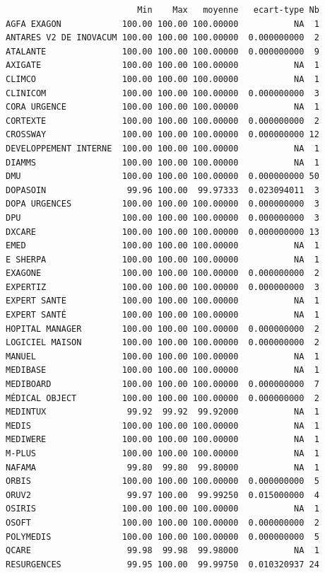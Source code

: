 \documentclass[]{article}
\begin{document}
\begin{verbatim}
                          Min    Max   moyenne   ecart-type Nb
AGFA EXAGON            100.00 100.00 100.00000           NA  1
ANTARES V2 DE INOVACUM 100.00 100.00 100.00000  0.000000000  2
ATALANTE               100.00 100.00 100.00000  0.000000000  9
AXIGATE                100.00 100.00 100.00000           NA  1
CLIMCO                 100.00 100.00 100.00000           NA  1
CLINICOM               100.00 100.00 100.00000  0.000000000  3
CORA URGENCE           100.00 100.00 100.00000           NA  1
CORTEXTE               100.00 100.00 100.00000  0.000000000  2
CROSSWAY               100.00 100.00 100.00000  0.000000000 12
DEVELOPPEMENT INTERNE  100.00 100.00 100.00000           NA  1
DIAMMS                 100.00 100.00 100.00000           NA  1
DMU                    100.00 100.00 100.00000  0.000000000 50
DOPASOIN                99.96 100.00  99.97333  0.023094011  3
DOPA URGENCES          100.00 100.00 100.00000  0.000000000  3
DPU                    100.00 100.00 100.00000  0.000000000  3
DXCARE                 100.00 100.00 100.00000  0.000000000 13
EMED                   100.00 100.00 100.00000           NA  1
E SHERPA               100.00 100.00 100.00000           NA  1
EXAGONE                100.00 100.00 100.00000  0.000000000  2
EXPERTIZ               100.00 100.00 100.00000  0.000000000  3
EXPERT SANTE           100.00 100.00 100.00000           NA  1
EXPERT SANTÉ           100.00 100.00 100.00000           NA  1
HOPITAL MANAGER        100.00 100.00 100.00000  0.000000000  2
LOGICIEL MAISON        100.00 100.00 100.00000  0.000000000  2
MANUEL                 100.00 100.00 100.00000           NA  1
MEDIBASE               100.00 100.00 100.00000           NA  1
MEDIBOARD              100.00 100.00 100.00000  0.000000000  7
MÉDICAL OBJECT         100.00 100.00 100.00000  0.000000000  2
MEDINTUX                99.92  99.92  99.92000           NA  1
MEDIS                  100.00 100.00 100.00000           NA  1
MEDIWERE               100.00 100.00 100.00000           NA  1
M-PLUS                 100.00 100.00 100.00000           NA  1
NAFAMA                  99.80  99.80  99.80000           NA  1
ORBIS                  100.00 100.00 100.00000  0.000000000  5
ORUV2                   99.97 100.00  99.99250  0.015000000  4
OSIRIS                 100.00 100.00 100.00000           NA  1
OSOFT                  100.00 100.00 100.00000  0.000000000  2
POLYMEDIS              100.00 100.00 100.00000  0.000000000  5
QCARE                   99.98  99.98  99.98000           NA  1
RESURGENCES             99.95 100.00  99.99750  0.010320937 24

\end{verbatim}
\end{document}
